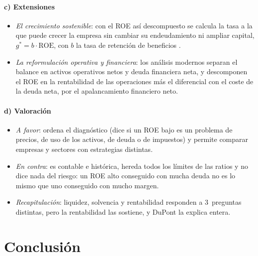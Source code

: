 \documentclass[11pt]{article}
\begin{document}
\begin{infografia}[H]
\centering
\caption{El árbol de DuPont, con las cifras de la empresa del ejemplo}\label{figu:dupont}
\end{infografia}

\paragraph{c) Extensiones}

\begin{itemize}
\item \emph{El crecimiento sostenible}: con el ROE así descompuesto se calcula la tasa a la que puede crecer la empresa sin cambiar su endeudamiento ni ampliar capital, $g^*=b\cdot\mathrm{ROE}$, con $b$ la tasa de retención de beneficios .
\item \emph{La reformulación operativa y financiera}: los análisis modernos separan el balance en activos operativos netos y deuda financiera neta, y descomponen el ROE en la rentabilidad de las operaciones más el diferencial con el coste de la deuda neta, por el apalancamiento financiero neto\nocite{Penman2013Financial}.
\end{itemize}

\paragraph{d) Valoración}

\begin{itemize}
\item \emph{A favor}: ordena el diagnóstico (dice si un ROE bajo es un problema de precios, de uso de los activos, de deuda o de impuestos) y permite comparar empresas y sectores con estrategias distintas.
\item \emph{En contra}: es contable e histórica, hereda todos los límites de las ratios y no dice nada del riesgo: un ROE alto conseguido con mucha deuda no es lo mismo que uno conseguido con mucho margen.
\item \emph{Recapitulación}: liquidez, solvencia y rentabilidad responden a 3~preguntas distintas, pero la rentabilidad las sostiene, y DuPont la explica entera.
\end{itemize}

\section*{Conclusión}
\end{document}

